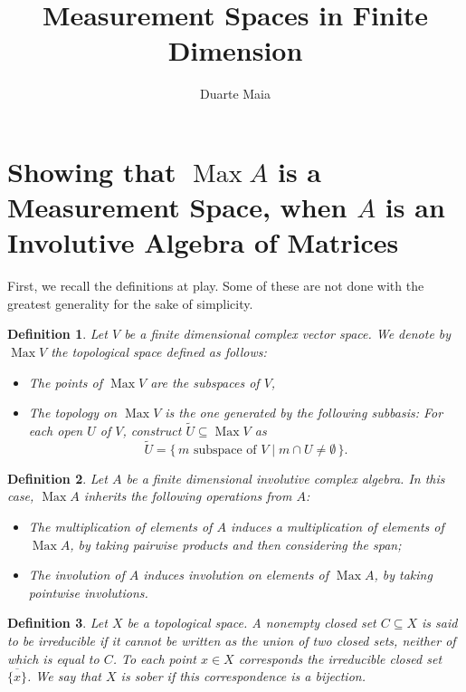 \documentclass{article}
\title{Measurement Spaces in Finite Dimension}
\author{Duarte Maia}
\theoremstyle{plain}
\newtheorem{definition}{Definition}
\theoremstyle{nonumberplain}
\DeclareMathOperator{\Max}{Max}
\begin{document}
\maketitle

\section{Showing that $\Max A$ is a Measurement Space, when $A$ is an Involutive Algebra of Matrices}

First, we recall the definitions at play. Some of these are not done with the greatest generality for the sake of simplicity.

\begin{definition}
Let $V$ be a finite dimensional complex vector space. We denote by $\Max V$ the topological space defined as follows:

\begin{itemize}
\item The points of $\Max V$ are the subspaces of $V$,
\item The topology on $\Max V$ is the one generated by the following subbasis: For each open $U$ of $V$, construct $\tilde U \subseteq \Max V$ as
\[\tilde U = \{\, \text{$m$ subspace of $V$} \mid m \cap U \neq \emptyset\,\}.\]
\end{itemize}
\end{definition}

\begin{definition}\label{defmaxa}
Let $A$ be a finite dimensional involutive complex algebra. In this case, $\Max A$ inherits the following operations from $A$:
\begin{itemize}
\item The multiplication of elements of $A$ induces a multiplication of elements of $\Max A$, by taking pairwise products and then considering the span;
\item The involution of $A$ induces involution on elements of $\Max A$, by taking pointwise involutions.
\end{itemize}
\end{definition}

\begin{definition}
Let $X$ be a topological space. A nonempty closed set $C \subseteq X$ is said to be irreducible if it cannot be written as the union of two closed sets, neither of which is equal to $C$. To each point $x \in X$ corresponds the irreducible closed set $\overline{\{x\}}$. We say that $X$ is sober if this correspondence is a bijection.
\end{definition}
\end{document}
